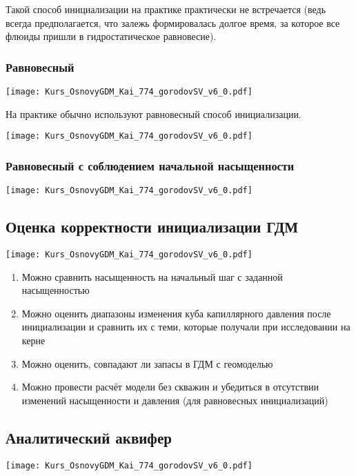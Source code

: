 \documentclass[main.tex]{subfiles}
\begin{document}
Такой способ инициализации на практике практически не встречается (ведь всегда предполагается, что залежь формировалась долгое время, за которое все флюиды пришли в гидростатическое равновесие).

\subsubsection{Равновесный}

\texttt{[image: Kurs\_OsnovyGDM\_Kai\_774\_gorodovSV\_v6\_0.pdf]}

На практике обычно используют равновесный способ инициализации.

\texttt{[image: Kurs\_OsnovyGDM\_Kai\_774\_gorodovSV\_v6\_0.pdf]}

\subsubsection{Равновесный с соблюдением начальной насыщенности}

\texttt{[image: Kurs\_OsnovyGDM\_Kai\_774\_gorodovSV\_v6\_0.pdf]}

\subsection{Оценка корректности инициализации ГДМ}

\texttt{[image: Kurs\_OsnovyGDM\_Kai\_774\_gorodovSV\_v6\_0.pdf]}

\begin{enumerate}
	\item Можно сравнить насыщенность на начальный шаг с заданной насыщенностью
	\item Можно оценить диапазоны изменения куба капиллярного давления после инициализации и сравнить их с теми, которые получали при исследовании на керне
	\item Можно оценить, совпадают ли запасы в ГДМ с геомоделью
	\item Можно провести расчёт модели без скважин и убедиться в отсутствии изменений насыщенности и давления (для равновесных инициализаций)
\end{enumerate}

\subsection{Аналитический аквифер}

\texttt{[image: Kurs\_OsnovyGDM\_Kai\_774\_gorodovSV\_v6\_0.pdf]}
\end{document}
